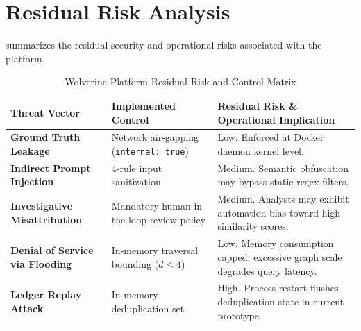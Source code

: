 \section{Residual Risk Analysis}
\label{sec:sec-residual-risk}
 summarizes the residual security and operational risks associated with the platform.

\begin{table}[htbp]
\centering
\small
\caption{Wolverine Platform Residual Risk and Control Matrix}
\label{tab:residual-risk-matrix}
\begin{tabular}{@{}p{3.5cm}p{3.8cm}p{5.5cm}@{}}
\toprule
\textbf{Threat Vector} & \textbf{Implemented Control} & \textbf{Residual Risk \& Operational Implication} \\ \midrule
\textbf{Ground Truth Leakage} & Network air-gapping (\texttt{internal: true}) & Low. Enforced at Docker daemon kernel level. \\ \addlinespace
\textbf{Indirect Prompt Injection} & 4-rule input sanitization & Medium. Semantic obfuscation may bypass static regex filters. \\ \addlinespace
\textbf{Investigative Misattribution} & Mandatory human-in-the-loop review policy & Medium. Analysts may exhibit automation bias toward high similarity scores. \\ \addlinespace
\textbf{Denial of Service via Flooding} & In-memory traversal bounding ($d \le 4$) & Low. Memory consumption capped; excessive graph scale degrades query latency. \\ \addlinespace
\textbf{Ledger Replay Attack} & In-memory deduplication set & High. Process restart flushes deduplication state in current prototype. \\ \bottomrule
\end{tabular}
\end{table}

